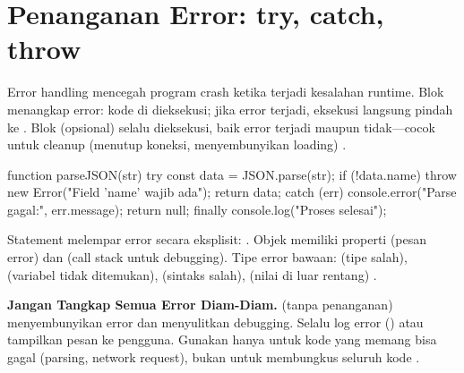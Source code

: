 \section{Penanganan Error: try, catch, throw}

Error handling mencegah program crash ketika terjadi kesalahan runtime. Blok  menangkap error: kode di  dieksekusi; jika error terjadi, eksekusi langsung pindah ke . Blok  (opsional) selalu dieksekusi, baik error terjadi maupun tidak---cocok untuk cleanup (menutup koneksi, menyembunyikan loading) \cite{jsInfo}.

\begin{webcode}[language=JavaScript, caption={try/catch/finally dan custom error}]
function parseJSON(str) {
  try {
    const data = JSON.parse(str);
    if (!data.name) {
      throw new Error("Field 'name' wajib ada");
    }
    return data;
  } catch (err) {
    console.error("Parse gagal:", err.message);
    return null;
  } finally {
    console.log("Proses selesai");
  }
}
\end{webcode}

Statement  melempar error secara eksplisit: . Objek  memiliki properti  (pesan error) dan  (call stack untuk debugging). Tipe error bawaan:  (tipe salah),  (variabel tidak ditemukan),  (sintaks salah),  (nilai di luar rentang) \cite{mdnJsGuide}.

\begin{catatan}
\textbf{Jangan Tangkap Semua Error Diam-Diam.}  (tanpa penanganan) menyembunyikan error dan menyulitkan debugging. Selalu log error () atau tampilkan pesan ke pengguna. Gunakan  hanya untuk kode yang memang bisa gagal (parsing, network request), bukan untuk membungkus seluruh kode \cite{jsInfo}.
\end{catatan}

